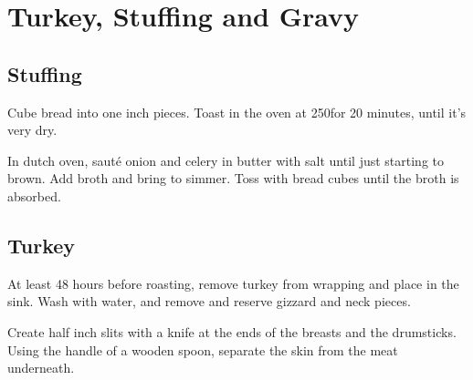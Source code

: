 \section{Turkey, Stuffing and Gravy}
\begin{recipe}


\subsection{Stuffing}



Cube bread into one inch pieces. Toast in the oven at 250\degree for 20 minutes, until it's very dry.



In dutch oven, sauté onion and celery in butter with salt until just starting to brown. Add broth and bring to simmer. Toss with bread cubes until the broth is absorbed.

\subsection{Turkey}



At least 48 hours before roasting, remove turkey from wrapping and place in the sink. Wash with water, and remove and reserve gizzard and neck pieces.

Create half inch slits with a knife at the ends of the breasts and the drumsticks. Using the handle of a wooden spoon, separate the skin from the meat underneath.


\end{recipe}

